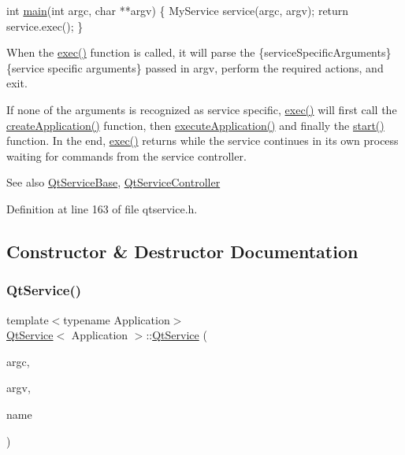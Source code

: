 \begin{DoxyCode}
\textcolor{keywordtype}{int} \mbox{\hyperlink{prerequisites_2_qt_web_app_2_demo1_2src_2main_8cpp_a0ddf1224851353fc92bfbff6f499fa97}{main}}(\textcolor{keywordtype}{int} argc, \textcolor{keywordtype}{char} **argv)
\{
    MyService service(argc, argv);
    \textcolor{keywordflow}{return} service.exec();
\}
\end{DoxyCode}


When the \mbox{\hyperlink{class_qt_service_base_afae2e589de71c1ae3ae8db3dc9ab9c64}{exec()}} function is called, it will parse the  \{service\+Specific\+Arguments\} \{service specific arguments\} passed in {\ttfamily argv}, perform the required actions, and exit.

If none of the arguments is recognized as service specific, \mbox{\hyperlink{class_qt_service_base_afae2e589de71c1ae3ae8db3dc9ab9c64}{exec()}} will first call the \mbox{\hyperlink{class_qt_service_a50aa2079345abfd0b1284be47e245b0b}{create\+Application()}} function, then \mbox{\hyperlink{class_qt_service_a84f5f60304117e1f11cc0ed16dc0b72e}{execute\+Application()}} and finally the \mbox{\hyperlink{class_qt_service_base_adbc0cd621b41bd3a6a1f62fda432e9e4}{start()}} function. In the end, \mbox{\hyperlink{class_qt_service_base_afae2e589de71c1ae3ae8db3dc9ab9c64}{exec()}} returns while the service continues in its own process waiting for commands from the service controller.

\begin{DoxySeeAlso}{See also}
\mbox{\hyperlink{class_qt_service_base}{Qt\+Service\+Base}}, \mbox{\hyperlink{class_qt_service_controller}{Qt\+Service\+Controller}} 
\end{DoxySeeAlso}


Definition at line 163 of file qtservice.\+h.



\subsection{Constructor \& Destructor Documentation}
\mbox{\label{class_qt_service_aca39304919f89cbb95fca64f44a761ae}} 
\subsubsection{\texorpdfstring{Qt\+Service()}{QtService()}}
{\footnotesize\ttfamily template$<$typename Application$>$ \\
\mbox{\hyperlink{class_qt_service}{Qt\+Service}}$<$ Application $>$\+::\mbox{\hyperlink{class_qt_service}{Qt\+Service}} (\begin{DoxyParamCaption}\item[{int}]{argc,  }\item[{char $\ast$$\ast$}]{argv,  }\item[{const Q\+String \&}]{name }\end{DoxyParamCaption})\hspace{0.3cm}{\ttfamily [inline]}}

